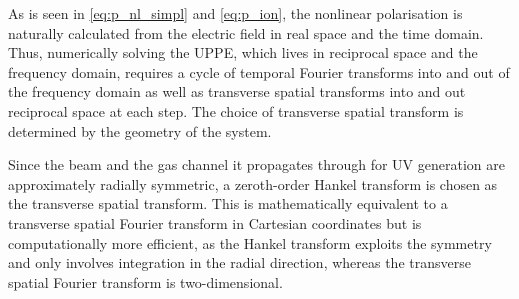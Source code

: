 \documentclass[a4paper]{jpconf}
\begin{document}
As is seen in \eqref{eq:p_nl_simpl} and \eqref{eq:p_ion}, the nonlinear polarisation is naturally calculated from the electric field in real space and the time domain. Thus, numerically solving the UPPE, which lives in reciprocal space and the frequency domain, requires a cycle of temporal Fourier transforms into and out of the frequency domain as well as transverse spatial transforms into and out reciprocal space at each step. The choice of transverse spatial transform is determined by the geometry of the system. \par 
Since the beam and the gas channel it propagates through for UV generation are approximately radially symmetric, a zeroth-order Hankel transform is chosen as the transverse spatial transform. This is mathematically equivalent to a  transverse spatial Fourier transform in Cartesian coordinates but is computationally more efficient, as the Hankel transform exploits the symmetry and only involves integration in the radial direction, whereas the transverse spatial Fourier transform is two-dimensional. 
 
\end{document}
